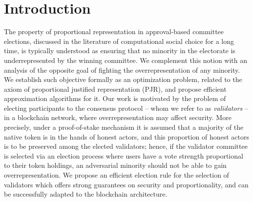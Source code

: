 \section{Introduction}

The property of proportional representation in approval-based committee elections, discussed in the literature of computational social choice for a long time, is typically understood as ensuring that no minority in the electorate is underrepresented by the winning committee. 
We complement this notion with an analysis of the opposite goal of fighting the overrepresentation of any minority. 
We establish such objective formally as an optimization problem, related to the axiom of proportional justified representation (PJR), and propose efficient approximation algorithms for it. 
%
Our work is motivated by the problem of electing participants to the consensus protocol -- whom we refer to as \emph{validators} -- in a blockchain network, where overrepresentation may affect security. 
More precisely, under a proof-of-stake mechanism it is assumed that a majority of the native token is in the hands of honest actors, and this proportion of honest actors is to be preserved among the elected validators; 
hence, if the validator committee is selected via an election process where users have a vote strength proportional to their token holdings, an adversarial minority should not be able to gain overrepresentation. 
We propose an efficient election rule for the selection of validators which offers strong guarantees on security and proportionality, and can be successfully adapted to the blockchain architecture.


